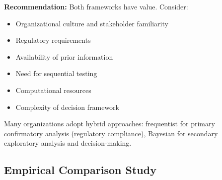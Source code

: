 \textbf{Recommendation:} Both frameworks have value. Consider:
\begin{itemize}
    \item Organizational culture and stakeholder familiarity
    \item Regulatory requirements
    \item Availability of prior information
    \item Need for sequential testing
    \item Computational resources
    \item Complexity of decision framework
\end{itemize}

Many organizations adopt hybrid approaches: frequentist for primary confirmatory analysis (regulatory compliance), Bayesian for secondary exploratory analysis and decision-making.

\subsection{Empirical Comparison Study}

